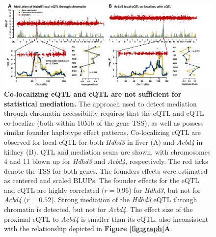 \documentclass[9pt,twocolumn,twoside]{gsajnl}
\begin{document}
\begin{figure}[hp]
\renewcommand{\familydefault}{\sfdefault}\normalfont
\centering
\includegraphics[width=\textwidth]{figs/mediation_or_colocal.pdf}
\caption{\textbf{Co-localizing eQTL and cQTL are not sufficient for statistical mediation.} The approach used to detect mediation through chromatin accessibility requires that the eQTL and cQTL co-localize (both within 10Mb of the gene TSS), as well as possess similar founder haplotype effect patterns. Co-localizing cQTL are observed for local-eQTL for both \textit{Hdhd3} in liver (A) and \textit{Acbd4} in kidney (B). QTL and mediation scans are shown, with chromosomes 4 and 11 blown up for \textit{Hdhd3} and \textit{Acbd4}, respectively. The red ticks denote the TSS for both genes. The founders effects were estimated as centered and scaled BLUPs. The founder effects for the eQTL and cQTL are highly correlated ($r = 0.96$) for \textit{Hdhd3}, but not for \textit{Acbd4} ($r = 0.52$). Strong mediation of the \textit{Hdhd3} eQTL through chromatin is detected, but not for \textit{Acbd4}. The effect size of the proximal cQTL to \textit{Acbd4} is smaller than its eQTL, also inconsistent with the relationship depicted in \textbf{Figure \ref{fig:graph}A}.
\label{fig:colocalization}}
\end{figure}
\end{document}

